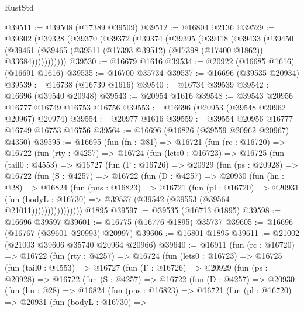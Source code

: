 \begin{lexlean}{RustStd}
\begin{coremodule}
@39511 := @39508 (@17389 @39509)
@39512 := @16804 @2136
@39529 := @39302
    (@39328
      (@39370
        (@39372
          (@39374
            (@39395
              (@39418
                (@39433
                  (@39450
                    (@39461
                      (@39465 (@39511 (@17393 @39512) (@17398 (@17400 @1862)) @33684)))))))))))
@39530 := @16679 @1616
@39534 := @20922 (@16685 @1616) (@16691 @1616)
@39535 := @16700 @35734
@39537 := @16696 (@39535 @20934)
@39539 := @16738 (@16739 @1616)
@39540 := @16734 @39539
@39542 := @16696 (@39540 @20948)
@39543 := @20954 @1616
@39548 := @39543 @20956 @16777 @16749 @16753 @16756
@39553 := @16696 (@20953 (@39548 @20962 @20967) @20974)
@39554 := @20977 @1616
@39559 := @39554 @20956 @16777 @16749 @16753 @16756
@39564 := @16696 (@16826 (@39559 @20962 @20967) @4350)
@39595 := @16695
    (fun (fn : @81) =>
    @16721
      (fun (rc : @16720) =>
      @16722
        (fun (rty : @4257) =>
        @16724
          (fun (lets0 : @16723) =>
          @16725
            (fun (tail0 : @4553) =>
            @16727
              (fun (Γ : @16726) =>
              @20929
                (fun (ps : @20928) =>
                @16722
                  (fun (S : @4257) =>
                  @16722
                    (fun (D : @4257) =>
                    @20930
                      (fun (hn : @28) =>
                      @16824
                        (fun (pns : @16823) =>
                        @16721
                          (fun (pl : @16720) =>
                          @20931
                            (fun (bodyL : @16730) =>
                            @39537 (@39542 (@39553 (@39564 @21011))))))))))))))))
    @1895
@39597 := @39535 (@16713 @1895)
@39598 := @16696 @39597
@39601 := @16775 (@16776 @1895) @35737
@39605 := @16696 (@16767 (@39601 @20993) @20997)
@39606 := @16801 @1895
@39611 := @21002 (@21003 @39606 @35740 @20964 @20966)
@39640 := @16911
    (fun (rc : @16720) =>
    @16722
      (fun (rty : @4257) =>
      @16724
        (fun (lets0 : @16723) =>
        @16725
          (fun (tail0 : @4553) =>
          @16727
            (fun (Γ : @16726) =>
            @20929
              (fun (ps : @20928) =>
              @16722
                (fun (S : @4257) =>
                @16722
                  (fun (D : @4257) =>
                  @20930
                    (fun (hn : @28) =>
                    @16824
                      (fun (pns : @16823) =>
                      @16721
                        (fun (pl : @16720) =>
                        @20931
                          (fun (bodyL : @16730) =>

\end{coremodule}
\end{lexlean}
